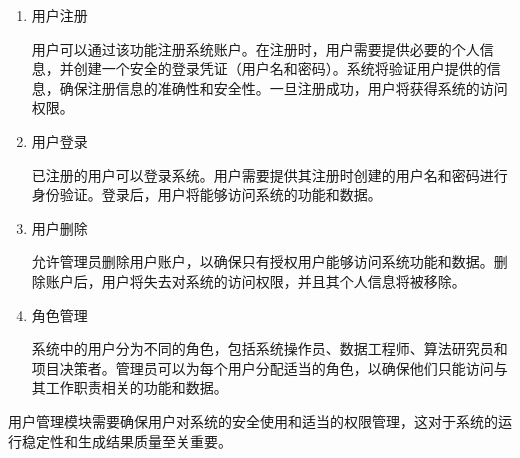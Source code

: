 \begin{enumerate}
	\item{用户注册}
	\par 用户可以通过该功能注册系统账户。在注册时，用户需要提供必要的个人信息，并创建一个安全的登录凭证（用户名和密码）。系统将验证用户提供的信息，确保注册信息的准确性和安全性。一旦注册成功，用户将获得系统的访问权限。
	
	\item{用户登录}
	\par 已注册的用户可以登录系统。用户需要提供其注册时创建的用户名和密码进行身份验证。登录后，用户将能够访问系统的功能和数据。
	
	\item{用户删除}
	\par 允许管理员删除用户账户，以确保只有授权用户能够访问系统功能和数据。删除账户后，用户将失去对系统的访问权限，并且其个人信息将被移除。
	
	\item{角色管理}
	\par 系统中的用户分为不同的角色，包括系统操作员、数据工程师、算法研究员和项目决策者。管理员可以为每个用户分配适当的角色，以确保他们只能访问与其工作职责相关的功能和数据。
\end{enumerate}

\par 用户管理模块需要确保用户对系统的安全使用和适当的权限管理，这对于系统的运行稳定性和生成结果质量至关重要。